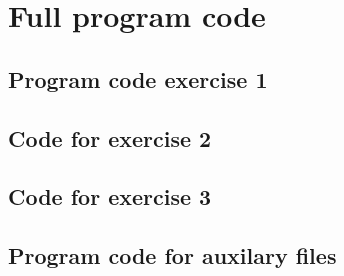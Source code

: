 \documentclass[a4paper]{article}
\begin{document}
\clearpage
\appendix
\section{Full program code}
\subsection{Program code exercise 1}
%

\subsection{Code for exercise 2}


\subsection{Code for exercise 3}


\subsection{Program code for auxilary files}\label{sec:aux}




\end{document}
